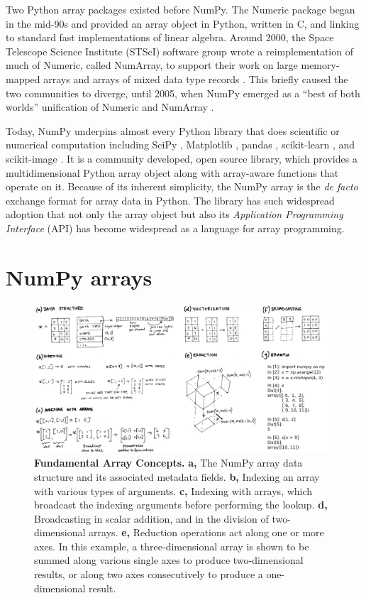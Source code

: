 Two Python array packages existed before NumPy.
The Numeric package began in the mid-90s and provided an array object in
Python, written in C, and linking to standard fast implementations of linear
algebra.
Around 2000, the Space Telescope Science Institute (STScI) software group wrote
a reimplementation of much of Numeric, called NumArray, to support their work
on large memory-mapped arrays and arrays of mixed data type
records \cite{STScI-slither}.
This briefly caused the two communities to diverge, until
2005, when NumPy emerged as a ``best of both worlds'' unification of Numeric
and NumArray \cite{oliphant2006guide}.

Today, NumPy underpins almost every Python library that does scientific or
numerical computation including SciPy \cite{virtanen2019scipy},
Matplotlib \cite{hunter2007matplotlib}, pandas \cite{mckinney-proc-scipy-2010},
scikit-learn \cite{pedregosa2011scikit}, and
scikit-image \cite{vanderwalt2014scikit}.
It is a community developed, open source library, which provides a
multidimensional Python array object along with array-aware functions
that operate on it.
Because of its inherent simplicity, the NumPy array is
the {\it de facto} exchange format for array data in Python.
The library has such widespread adoption that not only the array object but also its
{\it Application Programming Interface} (API) has become widespread as
a language for array programming.

\section*{NumPy arrays}

\begin{figure}
  \centering
  \includegraphics[width=\textwidth]{static/sketches/array-concepts}   
  \caption{\textbf{Fundamental Array Concepts.}
    \textbf{a,} The NumPy array data structure and its associated metadata fields.
    \textbf{b,} Indexing an array with various types of arguments.
    \textbf{c,} Indexing with arrays, which broadcast the indexing arguments before performing the lookup.
    \textbf{d,} Broadcasting in scalar addition, and in the division of two-dimensional arrays.
    \textbf{e,} Reduction operations act along one or more axes. In this
    example, a three-dimensional array is shown to be summed along various single
    axes to produce two-dimensional results, or along two axes consecutively to
    produce a one-dimensional result.
   }
  \label{fig:array-concepts}
\end{figure}


